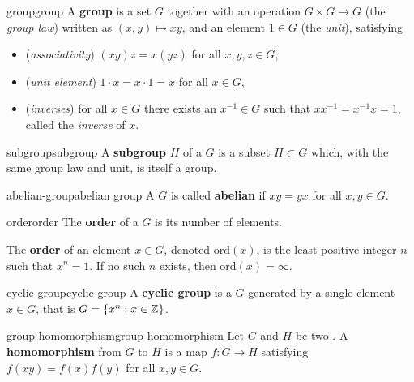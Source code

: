 \begin{topic}{group}{group}
    A \textbf{group} is a set $G$ together with an operation $G \times G \to G$ (the \textit{group law}) written as $(x, y) \mapsto xy$, and an element $1 \in G$ (the \textit{unit}), satisfying
    \begin{itemize}
        \item (\textit{associativity}) $(xy)z = x(yz)$ for all $x, y, z \in G$,
        \item (\textit{unit element}) $1 \cdot x = x \cdot 1 = x$ for all $x \in G$,
        \item (\textit{inverses}) for all $x \in G$ there exists an $x^{-1} \in G$ such that $x x^{-1} = x^{-1} x = 1$, called the \textit{inverse} of $x$.
    \end{itemize}
\end{topic}

\begin{topic}{subgroup}{subgroup}
    A \textbf{subgroup} $H$ of a  $G$ is a subset $H \subset G$ which, with the same group law and unit, is itself a group.
\end{topic}

\begin{topic}{abelian-group}{abelian group}
    A  $G$ is called \textbf{abelian} if $xy = yx$ for all $x, y \in G$.
\end{topic}

\begin{topic}{order}{order}
    The \textbf{order} of a  $G$ is its number of elements.
    
    The \textbf{order} of an element $x \in G$, denoted $\text{ord}(x)$, is the least positive integer $n$ such that $x^n = 1$. If no such $n$ exists, then $\text{ord}(x) = \infty$.
\end{topic}

\begin{topic}{cyclic-group}{cyclic group}
    A \textbf{cyclic group} is a  $G$ generated by a single element $x \in G$, that is $G = \{ x^n : x \in \mathbb{Z} \}$.
\end{topic}

\begin{topic}{group-homomorphism}{group homomorphism}
    Let $G$ and $H$ be two . A \textbf{homomorphism} from $G$ to $H$ is a map $f : G \to H$ satisfying $f(xy) = f(x) f(y)$ for all $x, y \in G$.
\end{topic}

